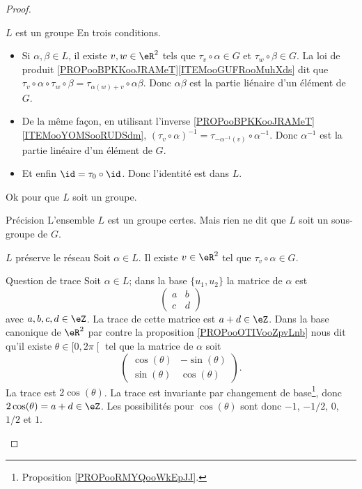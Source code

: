\begin{proof}
\begin{subproof}
        \item[\( L\) est un groupe]
            En trois conditions.
            \begin{itemize}
                \item 
                    Si \( \alpha,\beta\in L\), il existe \( v,w\in \eR^2\) tels que \( \tau_v\circ \alpha\in G\) et \( \tau_w\circ \beta\in G\). La loi de produit \ref{PROPooBPKKooJRAMeT}\ref{ITEMooGUFRooMuhXds} dit que \( \tau_v\circ \alpha\circ\tau_w\circ \beta=\tau_{\alpha(w)+v}\circ \alpha\beta\). Donc \( \alpha\beta\) est la partie liénaire d'un élément de \( G\). 
                \item
                    De la même façon, en utilisant l'inverse \ref{PROPooBPKKooJRAMeT}\ref{ITEMooYOMSooRUDSdm}, \( (\tau_v\circ\alpha)^{-1}= \tau_{-\alpha^{-1}(v)}\circ \alpha^{-1}   \). Donc \( \alpha^{-1}\) est la partie linéaire d'un élément de \( G\).
                \item
                    Et enfin \( \id=\tau_0\circ \id\). Donc l'identité est dans \( L\).
            \end{itemize}
            Ok pour que \( L\) soit un groupe.

        \item[Précision]
            L'ensemble \( L\) est un groupe certes. Mais rien ne dit que \( L\) soit un sous-groupe de \( G\).
        \item[\( L\) préserve le réseau]
            Soit \( \alpha\in L\). Il existe \( v\in \eR^2\) tel que \( \tau_v\circ \alpha\in G\).
        \item[Question de trace]
            Soit \( \alpha\in L\); dans la base \( \{ u_1,u_2 \}\) la matrice de \( \alpha\) est
            \begin{equation}
                \begin{pmatrix}
                    a&b\\
                    c&d
                \end{pmatrix}
            \end{equation}
            avec \( a,b,c,d\in \eZ\). La trace de cette matrice est \( a+d\in \eZ\). Dans la base canonique de \( \eR^2\) par contre la proposition \ref{PROPooOTIVooZpvLnb} nous dit qu'il existe \( \theta\in \mathopen[ 0 , 2\pi \mathclose[\) tel que la matrice de \( \alpha\) soit
                \begin{equation}
                    \begin{pmatrix}
                        \cos(\theta)    &   -\sin(\theta)    \\ 
                        \sin(\theta)    &   \cos(\theta)    
                    \end{pmatrix}.
                \end{equation}
                La trace est \( 2\cos(\theta)\). La trace est invariante par changement de base\footnote{Proposition \ref{PROPooRMYQooWkEpJJ}.}, donc \( 2\cos(\theta)=a+d\in \eZ\). Les possibilités pour \( \cos(\theta)\) sont donc \( -1\), \( -1/2\), \( 0\), \( 1/2\) et \( 1\).


\end{subproof}
\end{proof}
